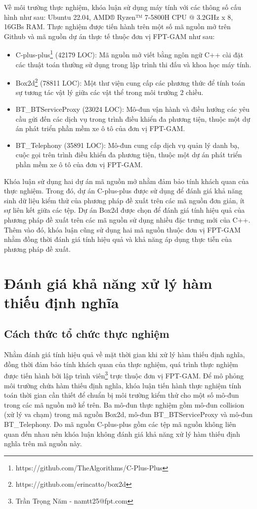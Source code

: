 Về môi trường thực nghiệm, khóa luận sử dụng máy tính với các thông số cấu hình như sau: Ubuntu 22.04, AMD® Ryzen™ 7-5800H CPU @ 3.2GHz x 8, 16GBs RAM. Thực nghiệm được tiến hành trên một số mã nguồn mở trên Github và mã nguồn dự án thực tế thuộc đơn vị FPT-GAM như sau:
\begin{itemize}
    \item C-plus-plus\footnote{https://github.com/TheAlgorithms/C-Plus-Plus} (42179 LOC): Mã nguồn mở viết bằng ngôn ngữ C++ cài đặt các thuật toán thường sử dụng trong lập trình thi đấu và khoa học máy tính.
    \item Box2d\footnote{https://github.com/erincatto/box2d} (78811 LOC): Một thư viện cung cấp các phương thức để tính toán sự tương tác vật lý giữa các vật thể trong môi trường 2 chiều.
    \item BT\_BTServiceProxy (23024 LOC): Mô-đun vận hành và điều hướng các yêu cầu gửi đến các dịch vụ trong trình điều khiển đa phương tiện, thuộc một dự án phát triển phần mềm xe ô tô của đơn vị FPT-GAM.
    \item BT\_Telephony (35891 LOC): Mô-đun cung cấp dịch vụ quản lý danh bạ, cuộc gọi trên trình điều khiển đa phương tiện, thuộc một dự án phát triển phần mềm xe ô tô của đơn vị FPT-GAM.
\end{itemize}

Khóa luận sử dụng hai dự án mã nguồn mở nhằm đảm bảo tính khách quan của thực nghiệm. Trong đó, dự án C-plus-plus được sử dụng để đánh giá khả năng sinh dữ liệu kiểm thử của phương pháp đề xuất trên các mã nguồn đơn giản, ít sự liên kết giữa các tệp. Dự án Box2d được chọn để đánh giá tính hiệu quả của phương pháp đề xuất trên các mã nguồn sử dụng nhiều đặc trưng mới của C++. Thêm vào đó, khóa luận cũng sử dụng hai mã nguồn thuộc đơn vị FPT-GAM nhằm đồng thời đánh giá tính hiệu quả và khả năng áp dụng thực tiễn của phương pháp đề xuất.

\section{Đánh giá khả năng xử lý hàm thiếu định nghĩa}
\subsection{Cách thức tổ chức thực nghiệm}
Nhằm đánh giá tính hiệu quả về mặt thời gian khi xử lý hàm thiếu định nghĩa, đồng thời đảm bảo tính khách quan của thực nghiệm, quá trình thực nghiệm được tiến hành bởi lập trình viên\footnote{Trần Trọng Năm - namtt25@fpt.com} trực thuộc đơn vị FPT-GAM. Để mô phỏng môi trường chứa hàm thiếu định nghĩa, khóa luận tiến hành thực nghiệm tính toán thời gian cần thiết để chuẩn bị môi trường kiểm thử cho một số mô-đun trong các mã nguồn mở kể trên. Ba mô-đun thực nghiệm gồm mô-đun collision (xử lý va chạm) trong mã nguồn Box2d, mô-đun BT\_BTServiceProxy và mô-đun BT\_Telephony. Do mã nguồn C-plus-plus gồm các tệp mã nguồn không liên quan đến nhau nên khóa luận không đánh giá khả năng xử lý hàm thiếu định nghĩa trên mã nguồn này.

